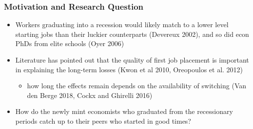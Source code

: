 \documentclass[11pt]{beamer}
\begin{document}
\begin{frame}[label = motivation]
	\frametitle{Motivation and Research Question} 
	\begin{itemize}

			\item Workers graduating into a recession would likely match to a lower level starting jobs than their luckier counterparts (Devereux 2002), and so did econ PhDs from elite schools (Oyer 2006)
		\item Literature has pointed out that the quality of first job placement is important in explaining the long-term losses (Kwon et al 2010, Oreopoulos et al. 2012)
		\begin{itemize}
			\item how long the effects remain depends on the availability of switching (Van den Berge 2018, Cockx and Ghirelli 2016)
		\end{itemize}
		

				\vspace{2mm}
		\item How do the newly mint economists who graduated from the recessionary periods catch up to their peers who started in good times?
%			
	
	\end{itemize}
\end{frame}
\end{document}
